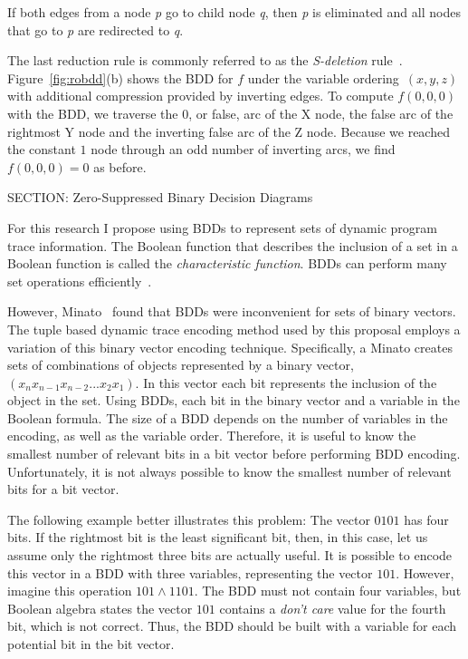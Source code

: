 { If both edges from a node \textit{p} go to
 child node \textit {q}, then \textit{p} is eliminated and all nodes that go to \textit{p} are redirected to \textit{q}.

The last reduction rule is commonly referred to as the \emph{S-deletion} rule~\cite{minato:01:STTT}. Figure~\ref{fig:robdd}(b) shows the BDD for $f$ under the variable ordering~$(x,y,z)$ with additional compression provided by inverting edges. To compute $f(0,0,0)$ with the BDD, we traverse the $0$, or false, arc of the X node, the false arc of the rightmost Y node and the inverting false arc of the Z node. Because we reached the constant $1$ node through an odd number of inverting arcs, we find $f(0,0,0)=0$ as before.

SECTION: Zero-Suppressed Binary Decision Diagrams


For this research I propose using BDDs to represent sets of dynamic program trace information.  The Boolean function that describes the inclusion of a set in a Boolean function is called the \textit{characteristic function}. BDDs can perform many set operations efficiently~\cite{bryant:86:ieeetc}.

However, Minato~\cite{minato:93:dac} found that BDDs were inconvenient for sets of binary vectors.  The tuple based dynamic trace encoding method used by this proposal employs a variation of this binary vector encoding technique.  Specifically, a Minato creates sets of combinations of objects represented by a binary vector, $(x_{n}x_{n-1}x_{n-2}...x_{2}x_{1})$.  In this vector each bit represents the inclusion of the object in the set.  Using BDDs, each bit in the binary vector and a variable in the Boolean formula.  The size of a BDD depends on the number of variables in the encoding, as well as the variable order.  Therefore, it is useful to know the smallest number of relevant bits in a bit vector before performing BDD encoding.  Unfortunately, it is not always possible to know the smallest number of relevant bits for a bit vector.

The following example better illustrates this problem: The vector ${0101}$ has four bits.  If the rightmost bit is the least significant bit, then, in this case, let us assume only the rightmost three bits are actually useful.  It is possible to encode this vector in a BDD with three variables, representing the vector ${101}$.  However, imagine this operation ${101} \wedge {1101}$. The BDD must not contain four variables, but Boolean algebra states the vector ${101}$ contains a \textit{don't care} value for the fourth bit, which is not correct.  Thus, the BDD should be built with a variable for each potential bit in the bit vector.

}

